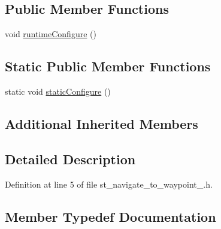 \subsection*{Public Member Functions}
\begin{DoxyCompactItemize}
\item 
void \hyperlink{structsm__dance__bot__strikes__back_1_1StNavigateToWaypoint1_ab12f2e6a60fa398d45db6249618c1dcf}{runtime\+Configure} ()
\end{DoxyCompactItemize}
\subsection*{Static Public Member Functions}
\begin{DoxyCompactItemize}
\item 
static void \hyperlink{structsm__dance__bot__strikes__back_1_1StNavigateToWaypoint1_ae843a5387c40de95c1352b5f5790d8e7}{static\+Configure} ()
\end{DoxyCompactItemize}
\subsection*{Additional Inherited Members}


\subsection{Detailed Description}


Definition at line 5 of file st\+\_\+navigate\+\_\+to\+\_\+waypoint\+\_.\+h.



\subsection{Member Typedef Documentation}
\mbox{\label{structsm__dance__bot__strikes__back_1_1StNavigateToWaypoint1_a6345cdcfe23da575ea59d70abe738ce1}} 
